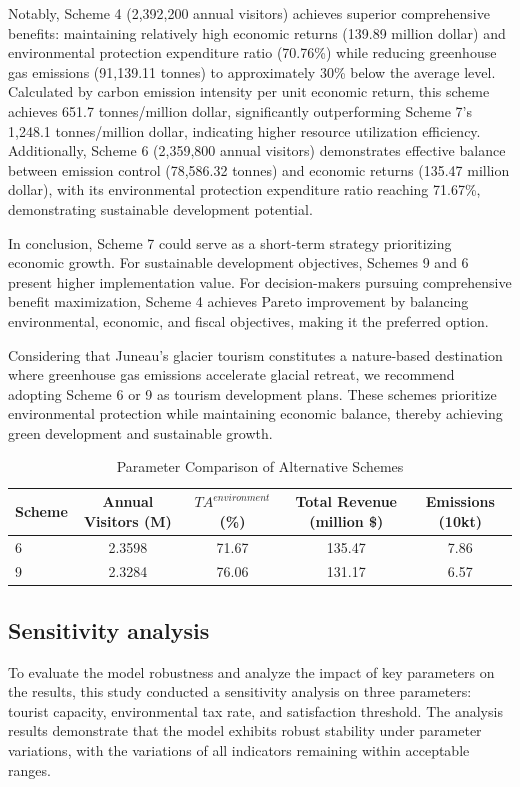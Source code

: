 \documentclass{mcmthesis}
\begin{document}
Notably, Scheme 4 (2,392,200 annual visitors) achieves superior comprehensive benefits: maintaining relatively high economic returns (139.89 million dollar) and environmental protection expenditure ratio (70.76\%) while reducing greenhouse gas emissions (91,139.11 tonnes) to approximately 30\% below the average level. Calculated by carbon emission intensity per unit economic return, this scheme achieves 651.7 tonnes/million dollar, significantly outperforming Scheme 7's 1,248.1 tonnes/million dollar, indicating higher resource utilization efficiency. Additionally, Scheme 6 (2,359,800 annual visitors) demonstrates effective balance between emission control (78,586.32 tonnes) and economic returns (135.47 million dollar), with its environmental protection expenditure ratio reaching 71.67\%, demonstrating sustainable development potential.

In conclusion, Scheme 7 could serve as a short-term strategy prioritizing economic growth. For sustainable development objectives, Schemes 9 and 6 present higher implementation value. For decision-makers pursuing comprehensive benefit maximization, Scheme 4 achieves Pareto improvement by balancing environmental, economic, and fiscal objectives, making it the preferred option.

Considering that Juneau's glacier tourism constitutes a nature-based destination where greenhouse gas emissions accelerate glacial retreat, we recommend adopting Scheme 6 or 9 as tourism development plans. These schemes prioritize environmental protection while maintaining economic balance, thereby achieving green development and sustainable growth.

\begin{table}[htbp]
\centering
\caption{Parameter Comparison of Alternative Schemes}
\label{tab:params}
\begin{tabular}{@{}lcccc@{}}
\toprule
Scheme & Annual Visitors (M) & $TA^{environment}$ (\%) & Total Revenue (million \$) & Emissions (10kt) \\
\midrule
6 & 2.3598 & 71.67 & 135.47 & 7.86 \\
9 & 2.3284 & 76.06 & 131.17 & 6.57 \\
\bottomrule
\end{tabular}
\end{table}


\subsection{Sensitivity analysis}
To evaluate the model robustness and analyze the impact of key parameters on the results, this study conducted a sensitivity analysis on three parameters: tourist capacity, environmental tax rate, and satisfaction threshold. The analysis results demonstrate that the model exhibits robust stability under parameter variations, with the variations of all indicators remaining within acceptable ranges.
\end{document}
